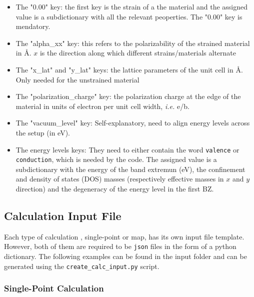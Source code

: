 \documentclass[a4paper,12pt]{article}
\newcommand{\angstrom}{\textup{\AA}}
\begin{document}
\begin{itemize}
\item The "0.00" key: the first key is the strain of a the material and the assigned value is a subdictionary with all the relevant peoperties. The "0.00" key is mendatory.

\item The "alpha\_xx" key: this refers to the polarizability of the strained material in \angstrom. $x$ is the direction along which different strains/materials alternate

\item The "x\_lat" and "y\_lat" keys: the lattice parameters of the unit cell in \angstrom. Only needed for the unstrained material

\item The "polarization\_charge" key: the polarization charge at the edge of the material in units of electron per unit cell width, \textit{i.e.} e/b.

\item The "vacuum\_level" key: Self-explanatory, need to align energy levels across the setup (in eV).

\item The energy levels keys: They need to either contain the word \texttt{valence} or \texttt{conduction}, which is needed by the code. The assigned value is a subdictionary with the energy of the band extremun (eV), the confinement and density of states (DOS) masses (respectively effective masses in $x$ and $y$ direction) and the degeneracy of the energy level in the first BZ.

\end{itemize}

\subsection{Calculation Input File}
Each type of calculation , single-point or map, has its own input file template. However, both of them are required to be \texttt{json} files in the form of a python dictionary. The following examples can be found in the input folder and can be generated using the \texttt{create\_calc\_input.py} script.

\subsubsection{Single-Point Calculation}
\end{document}
